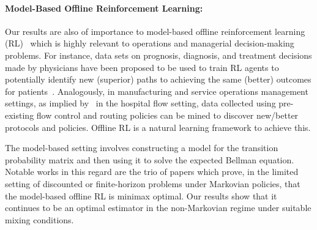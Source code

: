 \documentclass[opre,sglanonrev]{informs4}
\numberwithin{equation}{section}
\begin{document}
{\paragraph{Model-Based Offline Reinforcement Learning:}
Our results are also of importance to model-based offline reinforcement learning (RL)~\citep{levine2020offline,kidambi2020morel,yu2020mopo} which is highly relevant to operations and managerial decision-making problems. For instance, data sets on prognosis, diagnosis, and treatment decisions made by physicians have been proposed to be used to train RL agents to potentially identify new (superior) paths to achieving the same (better) outcomes for patients~\citep{shortreed2011informing,liu2020reinforcement,yu2021reinforcement,chen2021probabilistic}. 
Analogously, in manufacturing and service operations management settings, as implied by~\cite{armony2015patient} in the hospital flow setting, data collected using pre-existing flow control and routing policies can be mined to discover new/better protocols and policies. Offline RL is a natural learning framework to achieve this.  

The model-based setting involves constructing a model for the transition probability matrix and then using it to solve the expected Bellman equation. Notable works in this regard are the trio of papers \cite{li2022settling,li2022settlingh,yan2022model} which prove, in the limited setting of discounted or finite-horizon problems under Markovian policies, that the model-based offline RL is minimax optimal.
Our results show that it continues to be an optimal estimator in the non-Markovian regime under suitable mixing conditions.

}
\end{document}
